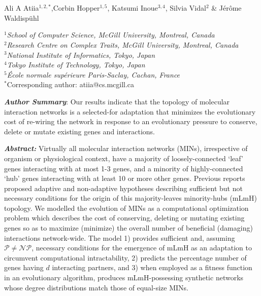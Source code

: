 \documentclass[12pt]{article}
\begin{document}
{}~\\~\\
\date{}

{\noindent\normalsize{\centering Ali A Atiia{\footnotesize$^{1,2,*}$},Corbin Hopper{\footnotesize$^{1,5}$}, Katsumi Inoue{\footnotesize$^{3,4}$}, Silvia Vidal{\footnotesize$^{2}$} \&  Jérôme Waldispühl}}

{\footnotesize
   \noindent$^1$\textit{School of Computer Science, McGill University, Montreal, Canada}~\\
   \noindent$^2$\textit{Research Centre on Complex Traits, McGill University, Montreal, Canada}~\\
   \noindent$^3$\textit{National Institute of Informatics, Tokyo, Japan}~\\
   \noindent$^4$\textit{Tokyo Institute of Technology, Tokyo, Japan}~\\
   \noindent$^5$\textit{École normale supérieure Paris-Saclay, Cachan, France}~\\
   \noindent$^*${Corresponding author: atiia@cs.mcgill.ca}~\\
}

\vspace{15pt}
{\noindent\textit{\textbf{Author Summary}}: Our results indicate that the topology of molecular interaction networks is a selected-for adaptation that minimizes the evolutionary cost of re-wiring the network in response to an evolutionary pressure to conserve, delete or mutate existing genes and interactions.}

\vspace{15pt}
\noindent\textit{\textbf{Abstract:}} Virtually all molecular interaction networks (MINs), irrespective of organism or physiological context, have a majority of loosely-connected `leaf' genes interacting with at most 1-3 genes, and a minority of highly-connected `hub' genes interacting with at least 10 or more other genes.
    Previous reports proposed adaptive and non-adaptive hypotheses describing sufficient but not necessary conditions for the origin of this majority-leaves minority-hubs (mLmH) topology.
    We modelled the evolution of MINs as a computational optimization problem which describes the cost of conserving, deleting or mutating existing genes so as to maximize (minimize) the overall number of beneficial (damaging) interactions network-wide.
    The model 1) provides sufficient and, assuming $\mathcal{P}\neq \mathcal{NP}$, necessary conditions for the emergence of mLmH as an adaptation to circumvent computational intractability, 2) predicts the percentage number of genes having $d$ interacting partners, and 3) when employed as a fitness function in an evolutionary algorithm, produces mLmH-possessing synthetic networks whose degree distributions match those of equal-size MINs.
\end{document}
